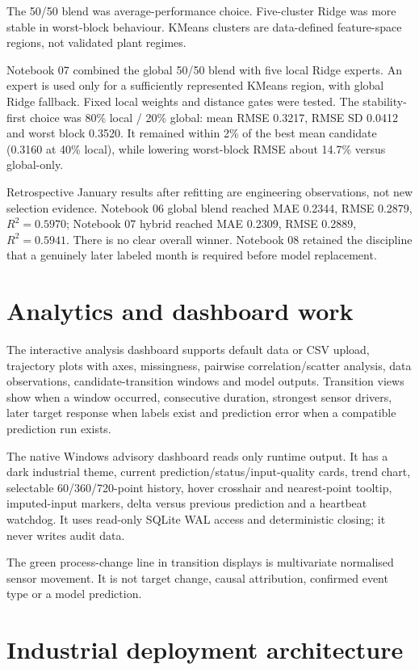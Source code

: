 \documentclass[10pt,a4paper]{article}
\begin{document}
The 50/50 blend was average-performance choice. Five-cluster Ridge was more stable in worst-block behaviour. KMeans clusters are data-defined feature-space regions, not validated plant regimes.

Notebook 07 combined the global 50/50 blend with five local Ridge experts. An expert is used only for a sufficiently represented KMeans region, with global Ridge fallback. Fixed local weights and distance gates were tested. The stability-first choice was 80\% local / 20\% global: mean RMSE 0.3217, RMSE SD 0.0412 and worst block 0.3520. It remained within 2\% of the best mean candidate (0.3160 at 40\% local), while lowering worst-block RMSE about 14.7\% versus global-only.

Retrospective January results after refitting are engineering observations, not new selection evidence. Notebook 06 global blend reached MAE 0.2344, RMSE 0.2879, $R^2=0.5970$; Notebook 07 hybrid reached MAE 0.2309, RMSE 0.2889, $R^2=0.5941$. There is no clear overall winner. Notebook 08 retained the discipline that a genuinely later labeled month is required before model replacement.

\section{Analytics and dashboard work}
The interactive analysis dashboard supports default data or CSV upload, trajectory plots with axes, missingness, pairwise correlation/scatter analysis, data observations, candidate-transition windows and model outputs. Transition views show when a window occurred, consecutive duration, strongest sensor drivers, later target response when labels exist and prediction error when a compatible prediction run exists.

The native Windows advisory dashboard reads only runtime output. It has a dark industrial theme, current prediction/status/input-quality cards, trend chart, selectable 60/360/720-point history, hover crosshair and nearest-point tooltip, imputed-input markers, delta versus previous prediction and a heartbeat watchdog. It uses read-only SQLite WAL access and deterministic closing; it never writes audit data.

The green process-change line in transition displays is multivariate normalised sensor movement. It is not target change, causal attribution, confirmed event type or a model prediction.

\section{Industrial deployment architecture}
\end{document}
